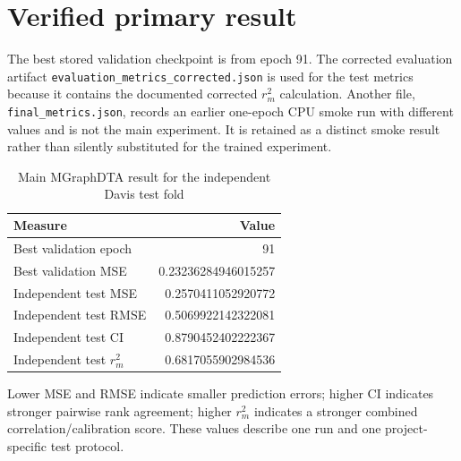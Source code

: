 \section{Verified primary result}
The best stored validation checkpoint is from epoch 91. The corrected evaluation artifact \texttt{evaluation\_metrics\_corrected.json} is used for the test metrics because it contains the documented corrected $r_m^2$ calculation. Another file, \texttt{final\_metrics.json}, records an earlier one-epoch CPU smoke run with different values and is not the main experiment. It is retained as a distinct smoke result rather than silently substituted for the trained experiment.
\begin{table}[H]\centering\caption{Main MGraphDTA result for the independent Davis test fold}\label{tab:mainresults}\begin{tabular}{lr}\toprule Measure & Value\\\midrule Best validation epoch & 91\\Best validation MSE & 0.23236284946015257\\Independent test MSE & 0.2570411052920772\\Independent test RMSE & 0.5069922142322081\\Independent test CI & 0.8790452402222367\\Independent test $r_m^2$ & 0.6817055902984536\\\bottomrule\end{tabular}\end{table}
Lower MSE and RMSE indicate smaller prediction errors; higher CI indicates stronger pairwise rank agreement; higher $r_m^2$ indicates a stronger combined correlation/calibration score. These values describe one run and one project-specific test protocol.

